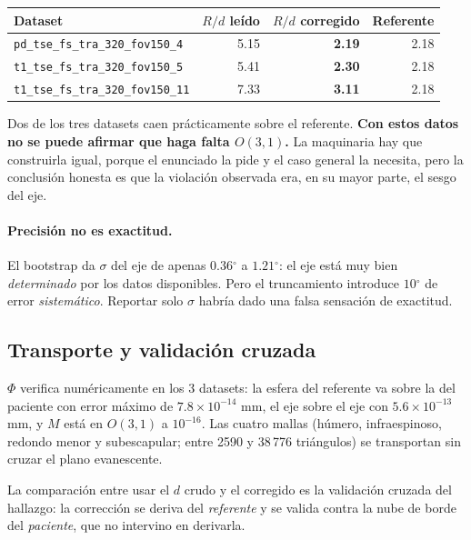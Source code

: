 \documentclass[11pt,a4paper]{article}
\providecommand{\degree}{\ensuremath{^\circ}}
\newcommand{\Rd}{\ensuremath{R/d}}
\newcommand{\Ot}{\ensuremath{O(3,1)}}
\begin{document}
\begin{center}
\begin{tabular}{@{}l r r r@{}}
\toprule
\textbf{Dataset} & \textbf{\Rd{} leído} & \textbf{\Rd{} corregido} & \textbf{Referente} \\
\midrule
\texttt{pd\_tse\_fs\_tra\_320\_fov150\_4}  & 5.15 & \textbf{2.19} & 2.18 \\
\texttt{t1\_tse\_fs\_tra\_320\_fov150\_5}  & 5.41 & \textbf{2.30} & 2.18 \\
\texttt{t1\_tse\_fs\_tra\_320\_fov150\_11} & 7.33 & \textbf{3.11} & 2.18 \\
\bottomrule
\end{tabular}
\end{center}

Dos de los tres datasets caen prácticamente sobre el referente. \textbf{Con estos datos no
se puede afirmar que haga falta \Ot.} La maquinaria hay que construirla igual, porque el
enunciado la pide y el caso general la necesita, pero la conclusión honesta es que la violación
observada era, en su mayor parte, el sesgo del eje.

\paragraph{Precisión no es exactitud.} El bootstrap da $\sigma$ del eje de apenas
$0.36\degree$ a $1.21\degree$: el eje está muy bien \emph{determinado} por los datos
disponibles. Pero el truncamiento introduce $10\degree$ de error \emph{sistemático}. Reportar
solo $\sigma$ habría dado una falsa sensación de exactitud.

\subsection{Transporte y validación cruzada}

$\Phi$ verifica numéricamente en los 3 datasets: la esfera del referente va sobre la del
paciente con error máximo de $7.8\times10^{-14}$ mm, el eje sobre el eje con
$5.6\times10^{-13}$ mm, y $M$ está en \Ot{} a $10^{-16}$. Las cuatro mallas (húmero,
infraespinoso, redondo menor y subescapular; entre 2590 y 38\,776 triángulos) se transportan
sin cruzar el plano evanescente.

La comparación entre usar el $d$ crudo y el corregido es la validación cruzada del hallazgo:
la corrección se deriva del \emph{referente} y se valida contra la nube de borde del
\emph{paciente}, que no intervino en derivarla.
\end{document}

